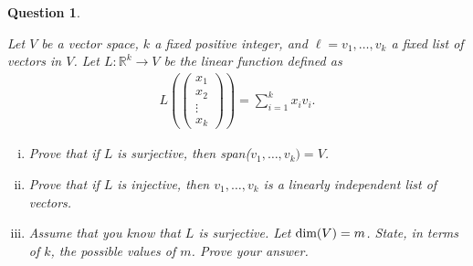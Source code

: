 \documentclass[12pt]{article}
\newtheorem{question}[thm]{Question}
\def\real{{\mathbb R}}
\def\dim{\textnormal{dim}}
\newcommand{\ColVecFour}[4]{\begin{pmatrix} #1\\ #2\\#3 \\ #4\end{pmatrix}}
\begin{document}
\begin{question}\label{que:CoordinateFunction}
	\normalfont
	
		
	Let $V$ be a vector space, $k$ a fixed positive integer, and $\ell = v_1,\dots, v_k$ a fixed list of vectors in $V$. Let $L:\real^k\to V$ be the linear function defined as
	\begin{align}\label{eq:LCoordinateMap}
		L(\ColVecFour{x_1}{x_2}{\vdots}{x_k}) = \sum_{i=1}^k x_iv_i.
	\end{align}
	
	\begin{enumerate}[(i)]
		\item Prove that if $L$ is surjective, then span($v_1,\dots, v_k) = V$.
		
		\item Prove that if $L$ is injective, then $v_1,\dots, v_k$ is a linearly independent list of vectors.
		
		\item Assume that you know that $L$ is surjective.  Let $\dim(V)=m$. State, in terms of $k$, the possible values of $m$.  Prove your answer.
		
		
	\end{enumerate}
\end{question}

\vspace{.5cm}
\end{document}

